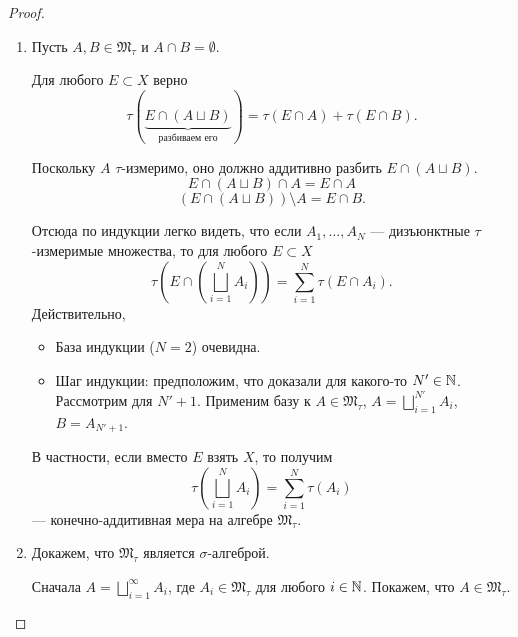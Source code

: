 \begin{proof}
\begin{enumerate}
        \item Пусть $A, B \in \mathfrak{M}_{\tau}$ и $A \cap B = \emptyset$.
        
        Для любого $E \subset X$ верно
        \[\tau(\underbrace{E \cap (A \sqcup B)}_{\text{разбиваем его}}) = \tau(E \cap A) + \tau(E \cap B).\]

        Поскольку $A$ $\tau$-измеримо, оно должно аддитивно разбить $E \cap (A \sqcup B)$.
        \[E \cap (A \sqcup B) \cap A = E \cap A\]
        \[(E \cap (A \sqcup B)) \setminus A = E \cap B.\]

        Отсюда по индукции легко видеть, что если $A_1, \dots, A_N$ — дизъюнктные $\tau$-измеримые множества, то для любого $E \subset X$
        \begin{equation}
            \tau\left(E \cap \left(\bigsqcup\limits_{i=1}^{N} A_i\right)\right) = \sum\limits_{i=1}^{N} \tau(E \cap A_i). \label{eq:3main2}
        \end{equation}
        Действительно,
        \begin{itemize}
            \item База индукции ($N = 2$) очевидна.
            \item Шаг индукции: предположим, что доказали для какого-то $N' \in \mathbb{N}$. Рассмотрим для $N' + 1$.
            Применим базу к $A \in \mathfrak{M}_{\tau}$, $A = \bigsqcup\limits_{i=1}^{N'} A_i$, $B = A_{N' + 1}$.
        \end{itemize}
        В частности, если вместо $E$ взять $X$, то получим
        \[\tau\left(\bigsqcup\limits_{i=1}^{N} A_i\right) = \sum\limits_{i=1}^{N} \tau(A_i)\]
        — конечно-аддитивная мера на алгебре $\mathfrak{M}_{\tau}$.

        \item Докажем, что $\mathfrak{M}_{\tau}$ является $\sigma$-алгеброй.
        
        Сначала $A = \bigsqcup\limits_{i=1}^{\infty} A_i$, где $A_i \in \mathfrak{M}_{\tau}$ для любого $i \in \mathbb{N}$.
        Покажем, что $A \in \mathfrak{M}_{\tau}$.


\end{enumerate}
\end{proof}
